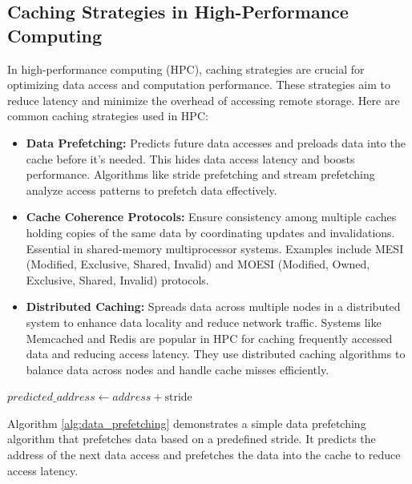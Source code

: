 \documentclass[12pt]{book} %
\begin{document}
\subsection{Caching Strategies in High-Performance Computing}

In high-performance computing (HPC), caching strategies are crucial for optimizing data access and computation performance. These strategies aim to reduce latency and minimize the overhead of accessing remote storage. Here are common caching strategies used in HPC:

\begin{itemize}
    \item \textbf{Data Prefetching:} Predicts future data accesses and preloads data into the cache before it's needed. This hides data access latency and boosts performance. Algorithms like stride prefetching and stream prefetching analyze access patterns to prefetch data effectively.
    
    \item \textbf{Cache Coherence Protocols:} Ensure consistency among multiple caches holding copies of the same data by coordinating updates and invalidations. Essential in shared-memory multiprocessor systems. Examples include MESI (Modified, Exclusive, Shared, Invalid) and MOESI (Modified, Owned, Exclusive, Shared, Invalid) protocols.
    
    \item \textbf{Distributed Caching:} Spreads data across multiple nodes in a distributed system to enhance data locality and reduce network traffic. Systems like Memcached and Redis are popular in HPC for caching frequently accessed data and reducing access latency. They use distributed caching algorithms to balance data across nodes and handle cache misses efficiently.
\end{itemize}


\FloatBarrier
\begin{algorithm}[h]
\caption{Data Prefetching Algorithm}\label{alg:data_prefetching}
\begin{algorithmic}[1]
    \State $predicted\_address \gets address + \text{stride}$
    \State {}
\EndFunction
\end{algorithmic}
\end{algorithm}
\FloatBarrier

Algorithm \ref{alg:data_prefetching} demonstrates a simple data prefetching algorithm that prefetches data based on a predefined stride. It predicts the address of the next data access and prefetches the data into the cache to reduce access latency.
\end{document}
